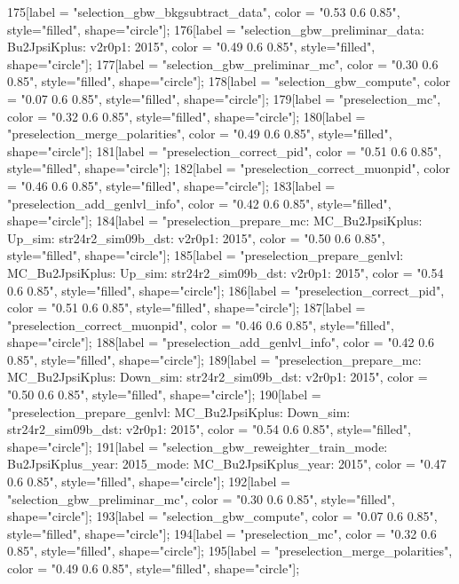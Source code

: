 {	175[label = "selection_gbw_bkgsubtract_data", color = "0.53 0.6 0.85", style="filled", shape="circle"];
	176[label = "selection_gbw_preliminar_data\nmode: Bu2JpsiKplus\nversion: v2r0p1\nyear: 2015", color = "0.49 0.6 0.85", style="filled", shape="circle"];
	177[label = "selection_gbw_preliminar_mc", color = "0.30 0.6 0.85", style="filled", shape="circle"];
	178[label = "selection_gbw_compute", color = "0.07 0.6 0.85", style="filled", shape="circle"];
	179[label = "preselection_mc", color = "0.32 0.6 0.85", style="filled", shape="circle"];
	180[label = "preselection_merge_polarities", color = "0.49 0.6 0.85", style="filled", shape="circle"];
	181[label = "preselection_correct_pid", color = "0.51 0.6 0.85", style="filled", shape="circle"];
	182[label = "preselection_correct_muonpid", color = "0.46 0.6 0.85", style="filled", shape="circle"];
	183[label = "preselection_add_genlvl_info", color = "0.42 0.6 0.85", style="filled", shape="circle"];
	184[label = "preselection_prepare_mc\nmode: MC_Bu2JpsiKplus\npolarity: Up\nstrip_sim: str24r2_sim09b_dst\nversion: v2r0p1\nyear: 2015", color = "0.50 0.6 0.85", style="filled", shape="circle"];
	185[label = "preselection_prepare_genlvl\nmode: MC_Bu2JpsiKplus\npolarity: Up\nstrip_sim: str24r2_sim09b_dst\nversion: v2r0p1\nyear: 2015", color = "0.54 0.6 0.85", style="filled", shape="circle"];
	186[label = "preselection_correct_pid", color = "0.51 0.6 0.85", style="filled", shape="circle"];
	187[label = "preselection_correct_muonpid", color = "0.46 0.6 0.85", style="filled", shape="circle"];
	188[label = "preselection_add_genlvl_info", color = "0.42 0.6 0.85", style="filled", shape="circle"];
	189[label = "preselection_prepare_mc\nmode: MC_Bu2JpsiKplus\npolarity: Down\nstrip_sim: str24r2_sim09b_dst\nversion: v2r0p1\nyear: 2015", color = "0.50 0.6 0.85", style="filled", shape="circle"];
	190[label = "preselection_prepare_genlvl\nmode: MC_Bu2JpsiKplus\npolarity: Down\nstrip_sim: str24r2_sim09b_dst\nversion: v2r0p1\nyear: 2015", color = "0.54 0.6 0.85", style="filled", shape="circle"];
	191[label = "selection_gbw_reweighter_train\ndata_mode: Bu2JpsiKplus\ndata_year: 2015\nmc_mode: MC_Bu2JpsiKplus\nmc_year: 2015", color = "0.47 0.6 0.85", style="filled", shape="circle"];
	192[label = "selection_gbw_preliminar_mc", color = "0.30 0.6 0.85", style="filled", shape="circle"];
	193[label = "selection_gbw_compute", color = "0.07 0.6 0.85", style="filled", shape="circle"];
	194[label = "preselection_mc", color = "0.32 0.6 0.85", style="filled", shape="circle"];
	195[label = "preselection_merge_polarities", color = "0.49 0.6 0.85", style="filled", shape="circle"];
}
